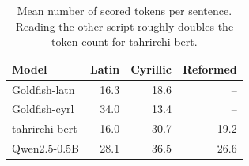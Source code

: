 \begin{table}[t]
\centering\small
\begin{tabular}{lrrr}
\toprule
Model & Latin & Cyrillic & Reformed \\
\midrule
Goldfish-latn & 16.3 & 18.6 & -- \\
Goldfish-cyrl & 34.0 & 13.4 & -- \\
tahrirchi-bert & 16.0 & 30.7 & 19.2 \\
Qwen2.5-0.5B & 28.1 & 36.5 & 26.6 \\
\bottomrule
\end{tabular}
\caption{Mean number of scored tokens per sentence. Reading the other script roughly doubles the token count for tahrirchi-bert.}
\label{tab:tokens}
\end{table}
